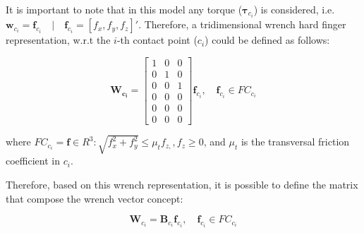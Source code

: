\begin{figure}[h!]
\end{figure}

It is important to note that in this model any torque ($\boldsymbol{\tau}_{c_{i}}$) is considered, i.e. $\boldsymbol{w}_{c_{i}} = \mathbf{f}_{c_i} \quad | \quad \mathbf{f}_{c_i} = [f_x, f_y, f_z]'$. Therefore, a tridimensional wrench hard finger representation, w.r.t the $i$-th contact point ($c_i$) could be defined as follows:

\begin{equation}
\mathbf{W_{c_i}}=\begin{bmatrix}
1 & 0 & 0 \\ 
0 & 1 & 0 \\ 
0 & 0 & 1 \\ 
0 & 0 & 0 \\ 
0 & 0 & 0 \\ 
0 & 0 & 0 
\end{bmatrix} \mathbf{f}_{c_i}, \quad \mathbf{f}_{c_i} \in F C_{c_i}
\end{equation}

\noindent
where $F C_{c_i}=\mathbf{f} \in \!R^3: \sqrt{f_{x}^{2}+f_{y}^{2}} \leq \mu_{t} f_{z,}, f_{z} \geq 0$, and $\mu_t$ is the transversal friction coefficient in $c_i$. 

Therefore, based on this wrench representation, it is possible to define the matrix that compose the wrench vector concept:

\begin{equation}
\mathbf{W}_{c_i}=\mathbf{B}_{c_i} \mathbf{f}_{c_i}, \quad \mathbf{f}_{c_i} \in F C_{c_i}
\end{equation}


